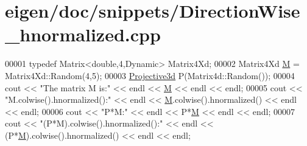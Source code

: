 \hypertarget{eigen_2doc_2snippets_2_direction_wise__hnormalized_8cpp_source}{}\section{eigen/doc/snippets/\+Direction\+Wise\+\_\+hnormalized.cpp}
\label{eigen_2doc_2snippets_2_direction_wise__hnormalized_8cpp_source}

\begin{DoxyCode}
00001 \textcolor{keyword}{typedef} Matrix<double,4,Dynamic> Matrix4Xd;
00002 Matrix4Xd \hyperlink{group___core___module_class_eigen_1_1_matrix}{M} = Matrix4Xd::Random(4,5);
00003 \hyperlink{group___geometry___module_gab9cec8c457da930391eb73370e07aaae}{Projective3d} P(Matrix4d::Random());
00004 cout << \textcolor{stringliteral}{"The matrix M is:"} << endl << \hyperlink{group___core___module_class_eigen_1_1_matrix}{M} << endl << endl;
00005 cout << \textcolor{stringliteral}{"M.colwise().hnormalized():"} << endl << \hyperlink{group___core___module_class_eigen_1_1_matrix}{M}.colwise().hnormalized() << endl << endl;
00006 cout << \textcolor{stringliteral}{"P*M:"} << endl << P*\hyperlink{group___core___module_class_eigen_1_1_matrix}{M} << endl << endl;
00007 cout << \textcolor{stringliteral}{"(P*M).colwise().hnormalized():"} << endl << (P*\hyperlink{group___core___module_class_eigen_1_1_matrix}{M}).colwise().hnormalized() << endl << endl;
\end{DoxyCode}
